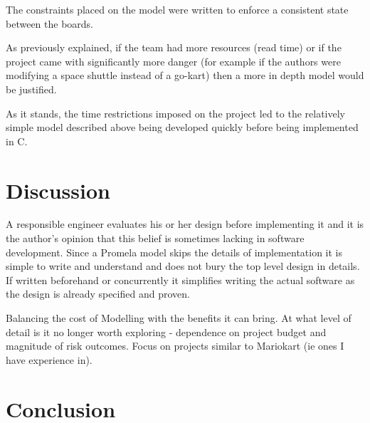 The constraints placed on the model were written to enforce a consistent state between
the boards. 

As previously explained, if the team had more resources (read time) or if the
project came with significantly more danger (for example if the authors were modifying
a space shuttle instead of a go-kart) then a more in depth model would be justified.

As it stands, the time restrictions imposed on the project led to the relatively simple
model described above being developed quickly before being implemented in C.


\section{Discussion}
A responsible engineer evaluates his or her design before implementing it and it is the author's opinion 
that this belief is sometimes lacking in software development. Since a Promela model skips
the details of implementation it is simple to write and understand and does not bury the top level design 
in details. If written beforehand or concurrently it  simplifies writing the actual software 
as the design is already specified and proven.

Balancing the cost of Modelling with the benefits it can bring. At what level of detail is it no longer worth 
exploring - dependence on project budget and magnitude of risk outcomes. Focus on projects similar to
Mariokart (ie ones I have experience in).

\section{Conclusion}
